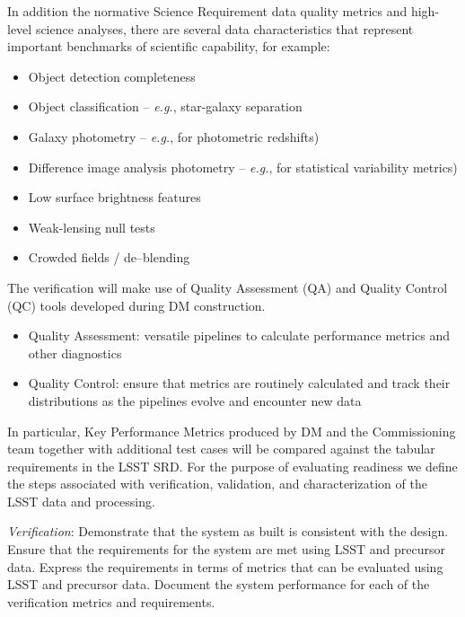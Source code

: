 In addition the normative Science Requirement data quality metrics and high-level science analyses, there are several data characteristics that represent important benchmarks of scientific capability, for example:

\begin{itemize}

	\item  Object detection completeness
	\item  Object classification -- {\it e.g.}, star-galaxy separation
	\item  Galaxy photometry -- {\it e.g.}, for photometric redshifts)
	\item  Difference image analysis photometry -- {\it e.g.}, for statistical variability metrics)
	\item  Low surface brightness features
	\item  Weak-lensing null tests
	\item  Crowded fields / de--blending
	
\end{itemize}

The verification will make use of Quality Assessment (QA) and Quality Control (QC) tools developed during DM construction.

\begin{itemize}

	\item Quality Assessment: versatile pipelines to calculate performance metrics and other diagnostics
	\item Quality Control: ensure that metrics are routinely calculated and track their distributions as the pipelines evolve and encounter new data
	
\end{itemize}

In particular, Key Performance Metrics produced by DM and the Commissioning team together with additional test cases will be compared against the tabular requirements in the LSST SRD.   For the purpose of evaluating readiness we define the steps associated with verification, validation, and characterization of the LSST data and processing.

{\it Verification}: Demonstrate that the system as built is consistent with the design. Ensure that the requirements for the system are met using LSST and precursor data. Express the requirements in terms of metrics that can be evaluated using LSST and precursor data. Document the system performance for each of the verification metrics and requirements.

